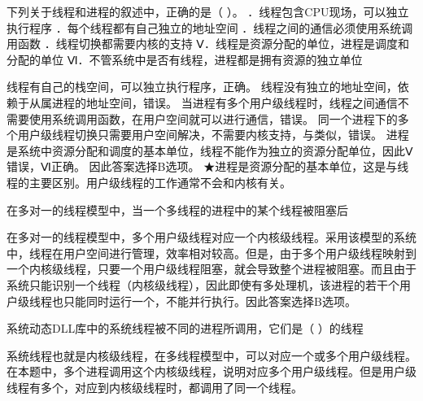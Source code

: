 \question 下列关于线程和进程的叙述中，正确的是（ ）。
．线程包含CPU现场，可以独立执行程序 ．每个线程都有自己独立的地址空间
．线程之间的通信必须使用系统调用函数 ．线程切换都需要内核的支持
Ⅴ．线程是资源分配的单位，进程是调度和分配的单位
Ⅵ．不管系统中是否有线程，进程都是拥有资源的独立单位
\par{}
\begin{solution}线程有自己的栈空间，可以独立执行程序，正确。
线程没有独立的地址空间，依赖于从属进程的地址空间，错误。
当进程有多个用户级线程时，线程之间通信不需要使用系统调用函数，在用户空间就可以进行通信，错误。
同一个进程下的多个用户级线程切换只需要用户空间解决，不需要内核支持，与类似，错误。
进程是系统中资源分配和调度的基本单位，线程不能作为独立的资源分配单位，因此Ⅴ错误，Ⅵ正确。
因此答案选择B选项。
★进程是资源分配的基本单位，这是与线程的主要区别。用户级线程的工作通常不会和内核有关。
\end{solution}
\question 在多对一的线程模型中，当一个多线程的进程中的某个线程被阻塞后
\par{}
\begin{solution}在多对一的线程模型中，多个用户级线程对应一个内核级线程。采用该模型的系统中，线程在用户空间进行管理，效率相对较高。但是，由于多个用户级线程映射到一个内核级线程，只要一个用户级线程阻塞，就会导致整个进程被阻塞。而且由于系统只能识别一个线程（内核级线程），因此即使有多处理机，该进程的若干个用户级线程也只能同时运行一个，不能并行执行。因此答案选择B选项。
\end{solution}
\question 系统动态DLL库中的系统线程被不同的进程所调用，它们是（ ）的线程
\par{}
\begin{solution}系统线程也就是内核级线程，在多线程模型中，可以对应一个或多个用户级线程。在本题中，多个进程调用这个内核级线程，说明对应多个用户级线程。但是用户级线程有多个，对应到内核级线程时，都调用了同一个线程。
\end{solution}
